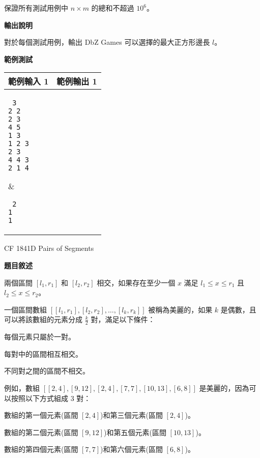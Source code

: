     保證所有測試用例中 $n\times m$ 的總和不超過 $10^6$。

    \textbf{輸出說明}

    對於每個測試用例，輸出 DbZ Games 可以選擇的最大正方形邊長 $l$。

    \textbf{範例測試}

    \begin{tabular}{|m{7cm}|m{7cm}|}
        \hline
        範例輸入 1 & 範例輸出 1 \\
        \hline
        \parbox[t]{7cm} %
        { \tt
        3 \\
        2 2 \\
        2 3 \\
        4 5 \\
        1 3 \\
        1 2 3 \\
        2 3 \\
        4 4 3 \\
        2 1 4 \\
        } &
        \parbox[t]{7cm}
        { \tt
        2 \\
        1 \\
        1 \\
        } \\
        \hline
    \end{tabular}
    
    \problem CF 1841D Pairs of Segments

    \textbf{題目敘述}

    兩個區間 $[l_1,r_1]$ 和 $[l_2,r_2]$ 相交，如果存在至少一個 $x$ 滿足 $l_1 \leq x \leq r_1$ 且 $l_2 \leq x \leq r_2$。

    一個區間數組 $[[l_1,r_1],[l_2,r_2],\ldots,[l_k,r_k]]$ 被稱為美麗的，如果 $k$ 是偶數，且可以將該數組的元素分成 $\frac{k}{2}$ 對，滿足以下條件：
    
    每個元素只屬於一對。
    
    每對中的區間相互相交。
    
    不同對之間的區間不相交。
    
    例如，數組 $[[2,4],[9,12],[2,4],[7,7],[10,13],[6,8]]$ 是美麗的，因為可以按照以下方式組成 3 對：
    
    數組的第一個元素(區間 $[2,4]$)和第三個元素(區間 $[2,4]$)。
    
    數組的第二個元素(區間 $[9,12]$)和第五個元素(區間 $[10,13]$)。
    
    數組的第四個元素(區間 $[7,7]$)和第六個元素(區間 $[6,8]$)。
    
